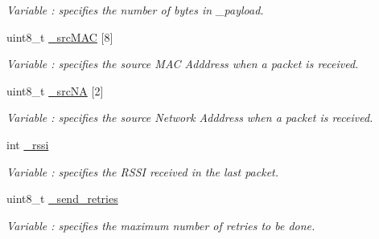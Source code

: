 \begin{DoxyCompactItemize}
\begin{DoxyCompactList}\small\item\em Variable \+: specifies the number of bytes in \+\_\+payload. \end{DoxyCompactList}\item 
uint8\+\_\+t \hyperlink{class_wasp_x_bee_core_a1b847b1f4fd0e3886c74ec70cf6cfa35}{\+\_\+src\+M\+AC} \mbox{[}8\mbox{]}\hypertarget{class_wasp_x_bee_core_a1b847b1f4fd0e3886c74ec70cf6cfa35}{}\label{class_wasp_x_bee_core_a1b847b1f4fd0e3886c74ec70cf6cfa35}

\begin{DoxyCompactList}\small\item\em Variable \+: specifies the source M\+AC Adddress when a packet is received. \end{DoxyCompactList}\item 
uint8\+\_\+t \hyperlink{class_wasp_x_bee_core_ac6cedc76a3ac0cdb60a05b43c3e1a604}{\+\_\+src\+NA} \mbox{[}2\mbox{]}\hypertarget{class_wasp_x_bee_core_ac6cedc76a3ac0cdb60a05b43c3e1a604}{}\label{class_wasp_x_bee_core_ac6cedc76a3ac0cdb60a05b43c3e1a604}

\begin{DoxyCompactList}\small\item\em Variable \+: specifies the source Network Adddress when a packet is received. \end{DoxyCompactList}\item 
int \hyperlink{class_wasp_x_bee_core_a1b926568c27c9eec76e46935c85fe937}{\+\_\+rssi}\hypertarget{class_wasp_x_bee_core_a1b926568c27c9eec76e46935c85fe937}{}\label{class_wasp_x_bee_core_a1b926568c27c9eec76e46935c85fe937}

\begin{DoxyCompactList}\small\item\em Variable \+: specifies the R\+S\+SI received in the last packet. \end{DoxyCompactList}\item 
uint8\+\_\+t \hyperlink{class_wasp_x_bee_core_a7e4df2ef4900652db6259d640bb3dde0}{\+\_\+send\+\_\+retries}
\begin{DoxyCompactList}\small\item\em Variable \+: specifies the maximum number of retries to be done. \end{DoxyCompactList}\end{DoxyCompactItemize}
